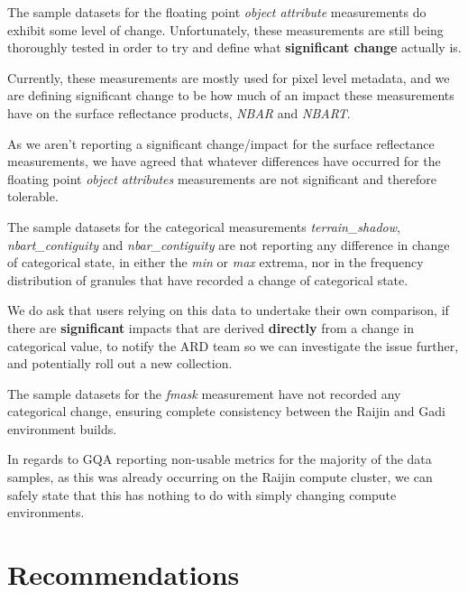 \documentclass[a4paper]{article}
\begin{document}
    \begin{flushleft}
      The sample datasets for the floating point \textit{object attribute} measurements do exhibit some level of change. Unfortunately, these measurements are still being thoroughly tested in order to try and define what \textbf{significant change} actually is. \par
      Currently, these measurements are mostly used for pixel level metadata, and we are defining significant change to be how much of an impact these measurements have on the surface reflectance products, \textit{NBAR} and \textit{NBART}. \par
      As we aren't reporting a significant change/impact for the surface reflectance measurements, we have agreed that whatever differences have occurred for the floating point \textit{object attributes} measurements are not significant and therefore tolerable. \par
      The sample datasets for the categorical measurements \textit{terrain\_shadow}, \textit{nbart\_contiguity} and \textit{nbar\_contiguity} are not reporting any difference in change of categorical state, in either the \textit{min} or \textit{max} extrema, nor in the frequency distribution of granules that have recorded a change of categorical state. \par
    \end{flushleft}

    \begin{flushleft}
      We do ask that users relying on this data to undertake their own comparison, if there are \textbf{significant} impacts that are derived \textbf{directly} from a change in categorical value, to notify the ARD team so we can investigate the issue further, and potentially roll out a new collection.\par
      The sample datasets for the \textit{fmask} measurement have not recorded any categorical change, ensuring complete consistency between the Raijin and Gadi environment builds.
    \end{flushleft}

    \begin{flushleft}
      In regards to GQA reporting non-usable metrics for the majority of the data samples, as this was already occurring on the Raijin compute cluster, we can safely state that this has nothing to do with simply changing compute environments.
    \end{flushleft}

  \section{Recommendations}
\end{document}
